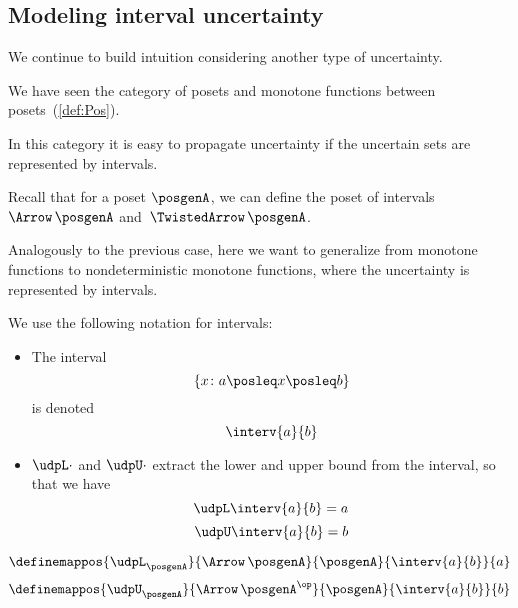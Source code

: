 \subsection{Modeling interval uncertainty}

We continue to build intuition considering another type of uncertainty.

We have seen the category \Pos of posets and monotone functions between posets~(\cref{def:Pos}).

In this category it is easy to propagate uncertainty if the uncertain sets are represented by intervals.

Recall that for a poset $\posgenA$, we can define the poset of intervals~$\Arrow\,\posgenA$
and~$\TwistedArrow\,\posgenA$.


Analogously to the previous case, here we want to generalize from monotone functions to nondeterministic monotone functions, where the uncertainty is represented by intervals.

We use the following notation for intervals:
\begin{itemize}
    \item The interval
    \begin{equation}
        \label{eq:interv-1}
        \{x\colon a \posleq x \posleq b\}
    \end{equation}
    is denoted
    \begin{equation}
        \label{eq:interv-2}
        \interv{a}{b}
    \end{equation}
    \item $\udpL\cdot$ and $\udpU\cdot$ extract the lower and upper bound from the interval, so that we have
    \begin{equation}
        \label{eq:interv-L}
        \udpL \interv{a}{b} = a
    \end{equation}
    \begin{equation}
        \label{eq:interv-U}
        \udpU \interv{a}{b} = b
    \end{equation}
\end{itemize}
%
\begin{equation}
    \label{eq:interv-L-def}
    \definemappos{\udpL_{\posgenA}}{\Arrow\,\posgenA}{\posgenA}%
    {\interv{a}{b}}{ a }
\end{equation}
%
\begin{equation}
    \label{eq:interv-U-def}
    \definemappos{\udpU_{\posgenA}}{\Arrow\,\posgenA^{\op}}{\posgenA}%
    {\interv{a}{b}}{ b }
\end{equation}


